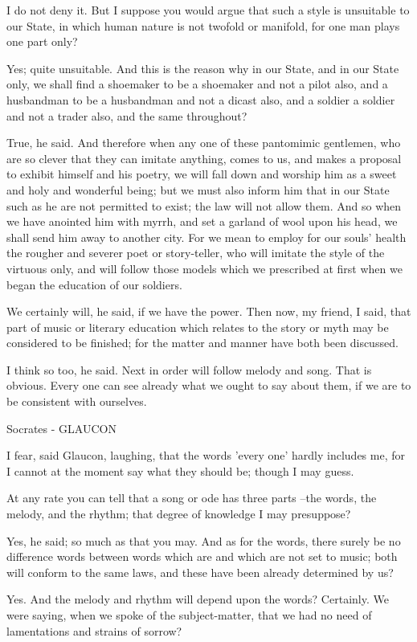 I do not deny it.
But I suppose you would argue that such a style is unsuitable to our State, in which human nature is not twofold or manifold, for one man plays one part only?

Yes; quite unsuitable.
And this is the reason why in our State, and in our State only, we shall find a shoemaker to be a shoemaker and not a pilot also, and a husbandman to be a husbandman and not a dicast also, and a soldier a soldier and not a trader also, and the same throughout?

True, he said.
And therefore when any one of these pantomimic gentlemen, who are so clever that they can imitate anything, comes to us, and makes a proposal to exhibit himself and his poetry, we will fall down and worship him as a sweet and holy and wonderful being; but we must also inform him that in our State such as he are not permitted to exist; the law will not allow them. And so when we have anointed him with myrrh, and set a garland of wool upon his head, we shall send him away to another city. For we mean to employ for our souls' health the rougher and severer poet or story-teller, who will imitate the style of the virtuous only, and will follow those models which we prescribed at first when we began the education of our soldiers.

We certainly will, he said, if we have the power.
Then now, my friend, I said, that part of music or literary education which relates to the story or myth may be considered to be finished; for the matter and manner have both been discussed.

I think so too, he said.
Next in order will follow melody and song.
That is obvious.
Every one can see already what we ought to say about them, if we are to be consistent with ourselves.

Socrates - GLAUCON

I fear, said Glaucon, laughing, that the words 'every one' hardly includes me, for I cannot at the moment say what they should be; though I may guess.

At any rate you can tell that a song or ode has three parts --the words, the melody, and the rhythm; that degree of knowledge I may presuppose?

Yes, he said; so much as that you may.
And as for the words, there surely be no difference words between words which are and which are not set to music; both will conform to the same laws, and these have been already determined by us?

Yes.
And the melody and rhythm will depend upon the words?
Certainly.
We were saying, when we spoke of the subject-matter, that we had no need of lamentations and strains of sorrow?

